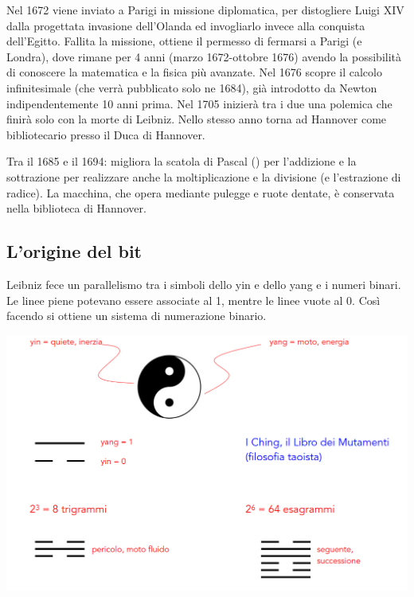 Nel 1672 viene inviato a Parigi in missione diplomatica, per distogliere Luigi XIV dalla
progettata invasione dell’Olanda ed invogliarlo invece alla conquista dell’Egitto.
Fallita la missione, ottiene il permesso di fermarsi a Parigi (e Londra), dove rimane per 4
anni (marzo 1672-ottobre 1676) avendo la possibilità di conoscere la matematica e la
fisica più avanzate. Nel 1676 scopre il calcolo infinitesimale (che verrà pubblicato solo ne 1684), già
introdotto da Newton indipendentemente 10 anni prima. Nel 1705 inizierà tra i due una
polemica che finirà solo con la morte di Leibniz.
Nello stesso anno torna ad Hannover come bibliotecario presso il Duca di Hannover.

Tra il 1685 e il 1694: migliora la scatola di Pascal () per l’addizione e la sottrazione per realizzare
anche la moltiplicazione e la divisione (e l’estrazione di radice). La macchina, che opera
mediante pulegge e ruote dentate, è conservata nella biblioteca di Hannover.

\subsection{L'origine del bit}

Leibniz fece un parallelismo tra i simboli dello yin e dello yang e i numeri binari.
Le linee piene potevano essere associate al 1, mentre le linee vuote al 0.
Così facendo si ottiene un sistema di numerazione binario.

\begin{center}
    \includegraphics[scale = 0.3]{images/Origine bit.png}
\end{center}

\pagebreak

